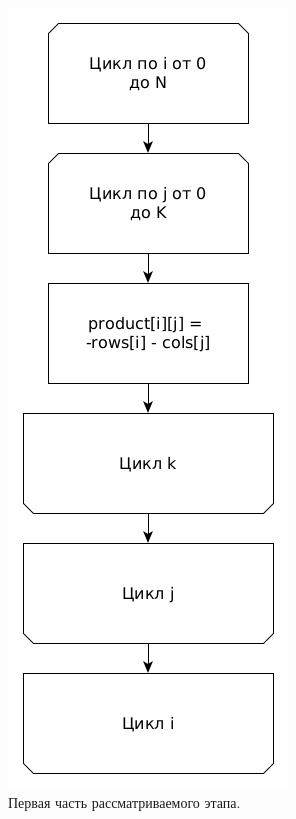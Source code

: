 \documentclass[12pt]{report}
\begin{document}
\begin{figure}
\begin{center}
\includegraphics[scale=0.4]{inc/img/paralPart21.png}
\captionsetup{justification=centering}
	\caption{Первая часть рассматриваемого этапа.}
	\label{img:paralPart21}	
\end{center}
\end{figure}
\end{document}
